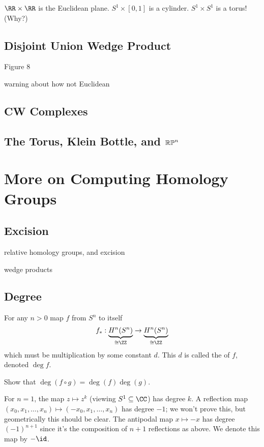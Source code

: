 \documentclass[11pt]{scrreprt}
\begin{document}
\begin{example}
	\listhack
	\begin{enumerate}[(a)]
		\ii $\RR \times \RR$ is the Euclidean plane.
		\ii $S^1 \times [0,1]$ is a cylinder.
		\ii $S^1 \times S^1$ is a torus! (Why?)
	\end{enumerate}
\end{example}

\section{Disjoint Union Wedge Product}

Figure 8

warning about how not Euclidean

\section{CW Complexes}

\section{The Torus, Klein Bottle, and $\mathbb{RP}^n$}


\chapter{More on Computing Homology Groups}

\section{Excision}
relative homology groups, and excision

wedge products


\section{Degree}
For any $n > 0$ map $f$ from $S^n$ to itself
\[ f_\ast : \underbrace{H^n(S^n)}_{\cong \ZZ} \to \underbrace{H^n(S^n)}_{\cong \ZZ} \]
which must be multiplication by some constant $d$.
This $d$ is called the  of $f$, denoted $\deg f$.
\begin{ques}
	Show that $\deg(f \circ g) = \deg(f) \deg(g)$.
\end{ques}

\begin{example}
	[Degree]
	\listhack
	\begin{enumerate}[(a)]
		\ii For $n=1$, the map $z \mapsto z^k$ (viewing $S^1 \subseteq \CC$)
		has degree $k$.
		\ii A reflection map $(x_0, x_1, \dots, x_n) \mapsto (-x_0, x_1, \dots, x_n)$
		has degree $-1$; we won't prove this, but geometrically this should be clear.
		\ii The antipodal map $x \mapsto -x$ has degree $(-1)^{n+1}$
		since it's the composition of $n+1$ reflections as above.
		We denote this map by $-\id$.
	\end{enumerate}
\end{example}
\end{document}
